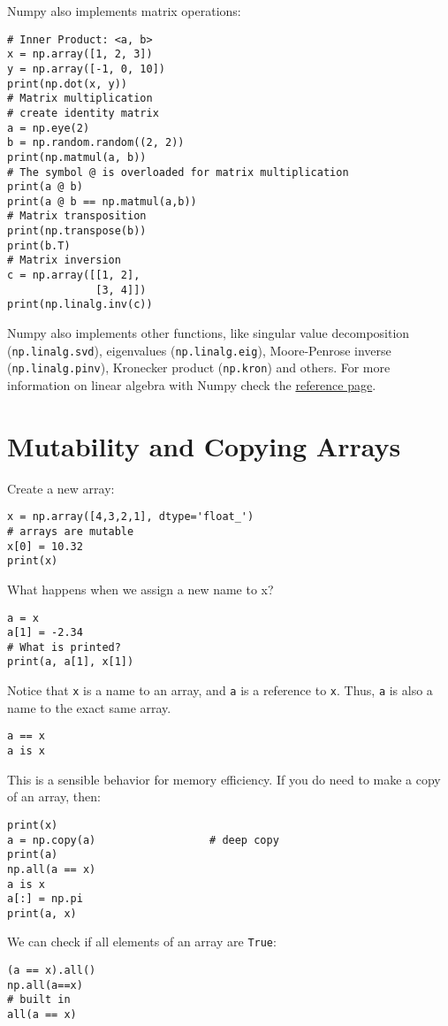 \documentclass[12pt, a4paper]{article}
\begin{document}
Numpy also implements matrix operations:
\lstset{language=jupyter-python,label= ,caption= ,captionpos=b,numbers=none}
\begin{lstlisting}
# Inner Product: <a, b>
x = np.array([1, 2, 3])
y = np.array([-1, 0, 10])
print(np.dot(x, y))
# Matrix multiplication
# create identity matrix
a = np.eye(2)
b = np.random.random((2, 2))
print(np.matmul(a, b))
# The symbol @ is overloaded for matrix multiplication
print(a @ b)
print(a @ b == np.matmul(a,b))
# Matrix transposition
print(np.transpose(b))
print(b.T)
# Matrix inversion
c = np.array([[1, 2],
              [3, 4]])
print(np.linalg.inv(c))
\end{lstlisting}
Numpy also implements other functions, like singular value decomposition (\texttt{np.linalg.svd}), eigenvalues (\texttt{np.linalg.eig}), Moore-Penrose inverse (\texttt{np.linalg.pinv}), Kronecker product (\texttt{np.kron}) and others.
For more information on linear algebra with Numpy check the \href{https://docs.scipy.org/doc/numpy/reference/routines.linalg.html}{reference page}.
\section{Mutability and Copying Arrays}
\label{sec:org8482bc6}
Create a new array:
\lstset{language=jupyter-python,label= ,caption= ,captionpos=b,numbers=none}
\begin{lstlisting}
x = np.array([4,3,2,1], dtype='float_')
# arrays are mutable
x[0] = 10.32
print(x)
\end{lstlisting}
What happens when we assign a new name to x?
\lstset{language=jupyter-python,label= ,caption= ,captionpos=b,numbers=none}
\begin{lstlisting}
a = x
a[1] = -2.34
# What is printed?
print(a, a[1], x[1])
\end{lstlisting}
Notice that \texttt{x} is a name to an array, and \texttt{a} is a reference to \texttt{x}. Thus, \texttt{a} is also a name to the exact same array.
\lstset{language=jupyter-python,label= ,caption= ,captionpos=b,numbers=none}
\begin{lstlisting}
a == x
a is x
\end{lstlisting}
This is a sensible behavior for memory efficiency.
If you do need to make a copy of an array, then:
\lstset{language=jupyter-python,label= ,caption= ,captionpos=b,numbers=none}
\begin{lstlisting}
print(x)
a = np.copy(a)                  # deep copy
print(a)
np.all(a == x)
a is x
a[:] = np.pi
print(a, x)
\end{lstlisting}
We can check if all elements of an array are \texttt{True}:
\lstset{language=jupyter-python,label= ,caption= ,captionpos=b,numbers=none}
\begin{lstlisting}
(a == x).all()
np.all(a==x)
# built in
all(a == x)
\end{lstlisting}
\end{document}
